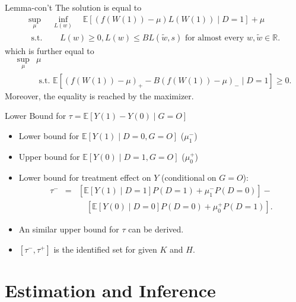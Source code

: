 \documentclass{beamer}					%
\newcommand{\Ep}{\mathbb{E}}
\begin{document}
    \begin{frame}{Lemma-con't}
        The solution is equal to
            \begin{equation*}
            \begin{array}{ll}
            \sup _{\mu} & \inf _{L(w)} \quad \mathbb{E}[(f(W(1))-\mu) L(W(1)) \mid D=1]+\mu \\
            \text { s.t. } &\quad  L(w) \geq 0, L(w) \leq B L(\tilde{w},s) \text { for almost every } w, \tilde{w} \in \mathbb{R}.
            \end{array}
            \end{equation*}
            which is further equal to
            \begin{equation*}
            \begin{array}{ll}
            \sup _{\mu} & \mu \\
            & \text { s.t. }  \mathbb{E}\left[(f(W(1))-\mu)_{+}-B(f(W(1))-\mu)_{-} \mid D=1\right] \geq 0.
            \end{array}
            \end{equation*}
            Moreover, the equality is reached by the maximizer.
    \end{frame}


\begin{frame}{Lower Bound for $\tau = \Ep[Y(1)-Y(0) \mid G = O]$}
    \begin{itemize}
        \item Lower bound for $\Ep[Y(1) \mid D = 0, G = O]$ ($\mu_1^-$)
        \item Upper bound for $\Ep[Y(0) \mid D = 1, G = O]$ ($\mu_0^+$)
        \item Lower bound for treatment effect on $Y$ (conditional on $G = O$):
	\begin{eqnarray*}
		\tau^-  & = & \left[\Ep[Y(1) \mid D = 1]P(D = 1) + \mu_1^-  P(D = 0)\right] - \\
		 & & \quad \left[\Ep[Y(0) \mid D = 0]P(D = 0) + \mu_0^+ P(D = 1)\right].
	\end{eqnarray*}
	\item An similar upper bound for $\tau$ can be derived.
	\item $[\tau^-, \tau^+]$ is the identified set for given $K$ and $H$.
    \end{itemize}
\end{frame}

\section{Estimation and Inference}
\end{document}
